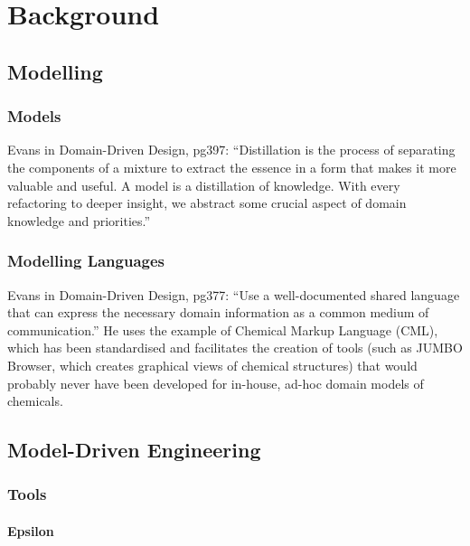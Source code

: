 
\chapter{Background}
\label{Background}

\section{Modelling}

\subsection{Models}

Evans in Domain-Driven Design, pg397: ``Distillation is the process of separating the components of a mixture to extract the essence in a form that makes it more valuable and useful. A model is a distillation of knowledge. With every refactoring to deeper insight, we abstract some crucial aspect of domain knowledge and priorities.''

\subsection{Modelling Languages}

Evans in Domain-Driven Design, pg377: ``Use a well-documented shared language that can express the necessary domain information as a common medium of communication.'' He uses the example of Chemical Markup Language (CML), which has been standardised and facilitates the creation of tools (such as JUMBO Browser, which creates graphical views of chemical structures) that would probably never have been developed for in-house, ad-hoc domain models of chemicals.


\section{Model-Driven Engineering}

\subsection{Tools}

\subsubsection{Epsilon}
\label{subsubsec:epsilon}

